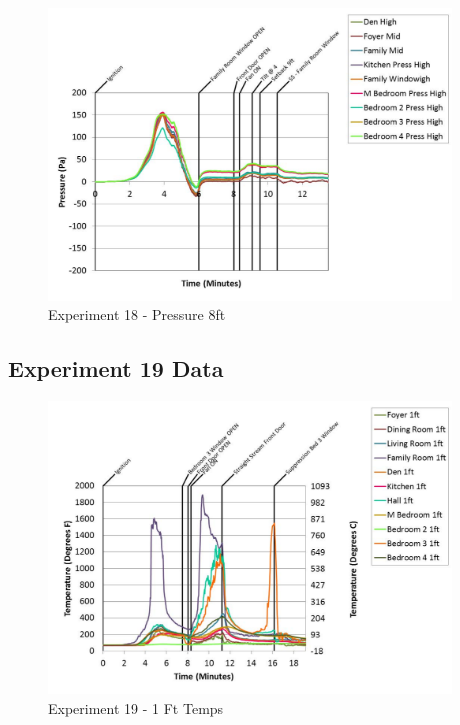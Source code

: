 \documentclass{article}
\begin{document}
\begin{appendices}
	\begin{figure}[h!]
		\centering
		\includegraphics[height=3.05in]{0_Images/Results_Charts/Exp_18_Charts/Pressure8ft.pdf}
		\caption{Experiment 18 - Pressure 8ft}
	\end{figure}
 
	\clearpage

		\clearpage
\clearpage		\large
\subsection{Experiment 19 Data} \label{App:Exp19Results} 

	\begin{figure}[h!]
		\centering
		\includegraphics[height=3.05in]{0_Images/Results_Charts/Exp_19_Charts/1FtTemps.pdf}
		\caption{Experiment 19 - 1 Ft Temps}
	\end{figure}
 


\end{appendices}
\end{document}

